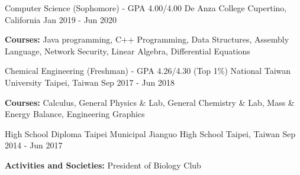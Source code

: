 

\begin{cventries}

  \cventry
    {Computer Science (Sophomore) - GPA 4.00/4.00} %
    {De Anza College} %
    {Cupertino, California} %
    {Jan 2019 - Jun 2020} %
    {
		\vspace{-5.0mm}
		\item {\textbf{Courses:} Java programming, C++ Programming, Data Structures, Assembly Language, Network Security, Linear Algebra, Differential Equations}
	}

  \cventry
    {Chemical Engineering (Freshman) - GPA 4.26/4.30 (Top 1\%)} %
    {National Taiwan University} %
    {Taipei, Taiwan} %
    {Sep 2017 - Jun 2018} %
    {
		\vspace{-5.0mm}
		\item {\textbf{Courses:} Calculus, General Physics \& Lab, General Chemistry \& Lab, Mass \& Energy Balance, Engineering Graphics}
	}

 \cventry
    {High School Diploma} %
    {Taipei Municipal Jianguo High School} %
    {Taipei, Taiwan} %
    {Sep 2014 - Jun 2017} %
    {
    		\vspace{-5.0mm}
    		\item {\textbf{Activities and Societies:} President of Biology Club}
    }

\end{cventries}
